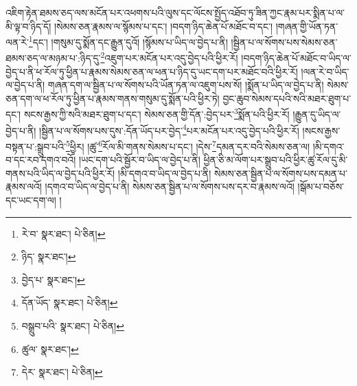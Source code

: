 འཇིག་རྟེན་ཐམས་ཅད་ལས་མངོན་པར་འཕགས་པའི་ལུས་དང་ལོངས་སྤྱོད་འཐོབ་ཏུ་ཟིན་ཀྱང་རྣམ་པར་སྨིན་པ་ལ་མི་ལྟ་བ་ཉིད་དོ། །སེམས་ཅན་རྣམས་ལ་སྙོམས་པ་དང་། །བདག་ཉིད་ཆེན་པོ་མཐོང་བ་དང་། །གཞན་གྱི་ཡོན་ཏན་ལན་རེ་\footnote{རེ་བ་  སྣར་ཐང་།  པེ་ཅིན། }དང་། །གསུམ་དུ་སྨོན་དང་རྒྱུན་དུའོ། །སྙོམས་པ་ཡིད་ལ་བྱེད་པ་ནི། །སྦྱིན་པ་ལ་སོགས་པས་སེམས་ཅན་ཐམས་ཅད་ལ་མཉམ་པ་:ཉིད་དུ་\footnote{ཉིད་  སྣར་ཐང་། }འཇུག་པར་མངོན་པར་འདུ་བྱེད་པའི་ཕྱིར་རོ། །བདག་ཉིད་ཆེན་པོ་མཐོང་བ་ཡིད་ལ་བྱེད་པ་ནི་ཕ་རོལ་ཏུ་ཕྱིན་པ་རྣམས་སེམས་ཅན་ལ་ཕན་པ་ཉིད་དུ་ཡང་དག་པར་མཐོང་བའི་ཕྱིར་རོ། །ལན་རེ་བ་ཡིད་ལ་བྱེད་པ་ནི། གཞན་དག་ལ་སྦྱིན་པ་ལ་སོགས་པའི་ཡོན་ཏན་ལ་འཇུག་པས་སོ། །སྨོན་པ་ཡིད་ལ་བྱེད་པ་ནི། སེམས་ཅན་དག་ལ་ཕ་རོལ་ཏུ་ཕྱིན་པ་རྣམས་གནས་གསུམ་དུ་སྨོན་པའི་ཕྱིར་ཏེ། བྱང་ཆུབ་སེམས་དཔའི་སའི་མཐར་ཐུག་པ་དང་། སངས་རྒྱས་ཀྱི་སའི་མཐར་ཐུག་པ་དང་། སེམས་ཅན་གྱི་དོན་:བྱེད་པར་\footnote{བྱེད་པ་  སྣར་ཐང་། }སྨོན་པའི་ཕྱིར་རོ། །རྒྱུན་དུ་ཡིད་ལ་བྱེད་པ་ནི། །སྦྱིན་པ་ལ་སོགས་པས་དུས་:དོན་ཡོད་པར་བྱེད་\footnote{དོན་ཡོད་  སྣར་ཐང་།  པེ་ཅིན། }པར་མངོན་པར་འདུ་བྱེད་པའི་ཕྱིར་རོ། །སངས་རྒྱས་བསྟན་པ་:སྒྲུབ་པའི་\footnote{བསྒྲུབ་པའི་  སྣར་ཐང་།  པེ་ཅིན། }ཕྱིར། །ཚུ་\footnote{ཚུལ་  སྣར་ཐང་། }རོལ་མི་གནས་སེམས་པ་དང་། །དེས་\footnote{དེར་  སྣར་ཐང་།  པེ་ཅིན། }དམན་དར་བའི་སེམས་ཅན་ལ། །མི་དགའ་བ་དང་རབ་དགའ་བའོ། །ཡང་དག་པའི་སྦྱོར་བ་ཡིད་ལ་བྱེད་པ་ནི། ཕྱིན་ཅི་མ་ལོག་པར་སྒྲུབ་པའི་ཕྱིར་ཚུ་རོལ་དུ་མི་གནས་པའི་ཡིད་ལ་བྱེད་པའི་ཕྱིར་རོ། །མི་དགའ་བ་ཡིད་ལ་བྱེད་པ་ནི། སེམས་ཅན་སྦྱིན་པ་ལ་སོགས་པས་དམན་པ་རྣམས་ལའོ། །དགའ་བ་ཡིད་ལ་བྱེད་པ་ནི། སེམས་ཅན་སྦྱིན་པ་ལ་སོགས་པས་དར་བ་རྣམས་ལའོ། །སྒོམ་པ་བཅོས་དང་ཡང་དག་ལ། །
